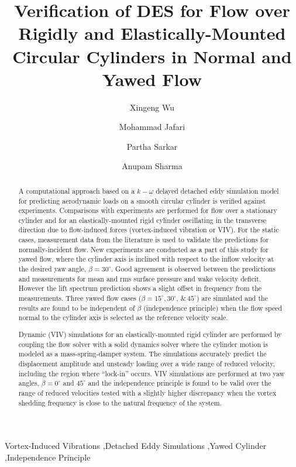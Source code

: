 \documentclass[12pt,authoryear]{elsarticle}
\begin{document}
\begin{frontmatter}

\title{Verification of DES for Flow over Rigidly and Elastically-Mounted
Circular Cylinders in Normal and Yawed Flow}


\author[1]{Xingeng Wu}
\author[1]{Mohammad Jafari} 
\author[2]{Partha Sarkar}
\author[3]{Anupam Sharma}

\address{Department of Aerospace Engineering, Iowa State University, Ames, Iowa, 50011}

\begin{abstract}
A computational approach based on a $k-\omega$ delayed detached eddy simulation
model for predicting aerodynamic loads on a smooth circular cylinder is
verified against experiments. Comparisons with experiments are performed for
flow over a stationary cylinder and for an elastically-mounted rigid cylinder
oscillating in the transverse direction due to flow-induced forces
(vortex-induced vibration or VIV). For the static cases, measurement data from
the literature is used to validate the predictions for normally-incident flow.
New experiments are conducted as a part of this study for yawed flow, where the
cylinder axis is inclined with respect to the inflow velocity at the desired
yaw angle, $\beta=30^\circ$. Good agreement is observed between the predictions
and measurements for mean and rms surface pressure and wake velocity deficit.
However the lift spectrum prediction shows a slight offset in frequency from
the measurements. Three yawed flow cases ($\beta=15^\circ, 30^\circ, \,\&\,
45^\circ$) are simulated and the results are found to be independent of $\beta$
(independence principle) when the flow speed normal to the cylinder axis is
selected as the reference velocity scale.

Dynamic (VIV) simulations for an elastically-mounted rigid cylinder are
performed by coupling the flow solver with a solid dynamics solver where the
cylinder motion is modeled as a mass-spring-damper system. The simulations
accurately predict the displacement amplitude and unsteady loading over a wide
range of reduced velocity, including the region where ``lock-in'' occurs. VIV
simulations are performed at two yaw angles, $\beta=0^\circ$ and $45^\circ$ and
the independence principle is found to be valid over the range of reduced
velocities tested with a slightly higher discrepancy when the vortex shedding
frequency is close to the natural frequency of the system.
\end{abstract}

\begin{keyword}
  Vortex-Induced Vibrations \sep Detached Eddy Simulations \sep Yawed Cylinder
  \sep Independence Principle
\end{keyword}
\end{frontmatter}
\end{document}
